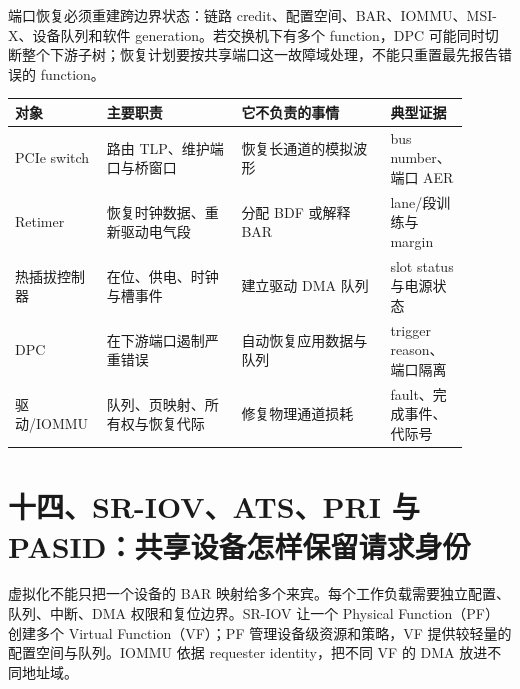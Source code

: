 端口恢复必须重建跨边界状态：链路 credit、配置空间、BAR、IOMMU、MSI-X、设备队列和软件 generation。若交换机下有多个 function，DPC 可能同时切断整个下游子树；恢复计划要按共享端口这一故障域处理，不能只重置最先报告错误的 function。

\begin{longtable}{L{0.17\linewidth}L{0.28\linewidth}L{0.31\linewidth}L{0.14\linewidth}}
\toprule
对象 & 主要职责 & 它不负责的事情 & 典型证据 \\
\midrule
PCIe switch & 路由 TLP、维护端口与桥窗口 & 恢复长通道的模拟波形 & bus number、端口 AER \\\tablerowrule
Retimer & 恢复时钟数据、重新驱动电气段 & 分配 BDF 或解释 BAR & lane/段训练与 margin \\\tablerowrule
热插拔控制器 & 在位、供电、时钟与槽事件 & 建立驱动 DMA 队列 & slot status 与电源状态 \\\tablerowrule
DPC & 在下游端口遏制严重错误 & 自动恢复应用数据与队列 & trigger reason、端口隔离 \\\tablerowrule
驱动/IOMMU & 队列、页映射、所有权与恢复代际 & 修复物理通道损耗 & fault、完成事件、代际号 \\
\bottomrule
\end{longtable}

\section{十四、SR-IOV、ATS、PRI 与 PASID：共享设备怎样保留请求身份}

虚拟化不能只把一个设备的 BAR 映射给多个来宾。每个工作负载需要独立配置、队列、中断、DMA 权限和复位边界。SR-IOV 让一个 Physical Function（PF）创建多个 Virtual Function（VF）；PF 管理设备级资源和策略，VF 提供较轻量的配置空间与队列。IOMMU 依据 requester identity，把不同 VF 的 DMA 放进不同地址域。

